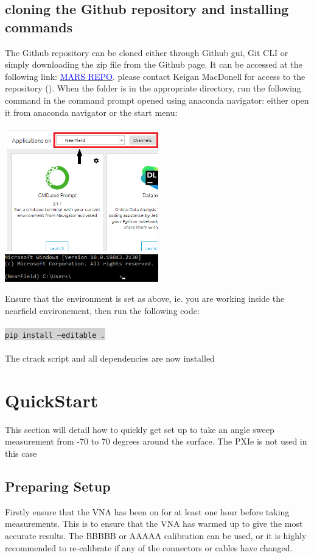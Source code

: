 \documentclass[hidelinks]{article}
\newcommand{\code}[1]{\colorbox{lightgray}{\texttt{#1}}}
\begin{document}
\subsection{cloning the Github repository and installing commands}
The Github repository can be cloned either through Github gui, Git CLI or simply downloading the zip file from the Github page. It can be accessed at the following link: \href{https://github.com/kgein/MARS-CircularTrackSystem}{\textcolor{blue}{MARS REPO}}. please contact Keigan MacDonell for access to the repository (). When the folder is in the appropriate directory, run the following command in the command prompt opened using anaconda navigator: either open it from anaconda navigator or the start menu:
\begin{center}
    \includegraphics[width=0.5\textwidth]{asdasda.png}
    \includegraphics[width=0.5\textwidth]{asdasdaaffwaf.png}
\end{center}
Ensure that the environment is set as above, ie. you are working inside the nearfield environement, then run the following code: \\\\\code{pip install --editable .}\\\\
The ctrack script and all dependencies are now installed

\section{QuickStart}
This section will detail how to quickly get set up to take an angle sweep measurement from -70 to 70 degrees around the surface. The PXIe is not used in this case

\subsection{Preparing Setup}
Firstly ensure that the VNA has been on for at least one hour before taking measurements. This is to ensure that the VNA has warmed up to give the most accurate results. The BBBBB or AAAAA calibration can be used, or it is highly recommended to re-calibrate if any of the connectors or cables have changed.\\
\end{document}
